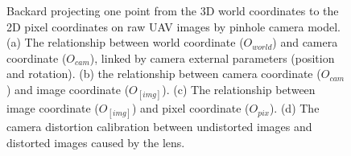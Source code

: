 \begin{figure}[htb]
  \begin{center}
  \end{center}
  \caption[Backard projection illustration graph]{
     Backard projecting one point from the 3D world coordinates to the 2D pixel coordinates on raw UAV images by pinhole camera model. (a) The relationship between world coordinate ($O_{world}$) and camera coordinate ($O_{cam}$), linked by camera external parameters (position and rotation). (b) the relationship between camera coordinate ($O_{cam}$) and image coordinate ($O_[img]$). (c) The relationship between image coordinate ($O_[img]$) and pixel coordinate ($O_{pix}$). (d) The camera distortion calibration between undistorted images and distorted images caused by the lens.
  }
  \label{fig:idps1}
\end{figure}